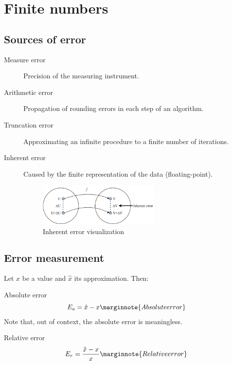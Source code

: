 \chapter{Finite numbers}



\section{Sources of error}

\begin{description}
    \item[Measure error] 
        Precision of the measuring instrument.

    \item[Arithmetic error] 
        Propagation of rounding errors in each step of an algorithm.

    \item[Truncation error] 
        Approximating an infinite procedure to a finite number of iterations.

    \item[Inherent error] 
        Caused by the finite representation of the data (floating-point).
        \begin{figure}[h]
            \centering
            \includegraphics[width=0.6\textwidth]{img/_inherent_error.pdf}
            \caption{Inherent error visualization}
        \end{figure}
\end{description}



\section{Error measurement}

Let $x$ be a value and $\hat{x}$ its approximation. Then:
\begin{descriptionlist}
    \item[Absolute error] 
        \[
            E_{a} = \hat{x} - x 
            \marginnote{Absolute error}
        \] 
        Note that, out of context, the absolute error is meaningless.
    \item[Relative error] 
        \[
            E_{r} = \frac{\hat{x} - x}{x} 
            \marginnote{Relative error}
        \] 
\end{descriptionlist}



